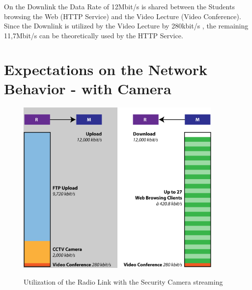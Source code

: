 \documentclass[a4paper,10pt]{book}\usepackage{graphicx}
\begin{document}
On the Downlink the Data Rate of 12Mbit/s is shared between the Students browsing the Web (HTTP Service) and the Video Lecture (Video Conference).
Since the Downlink is utilized by the Video Lecture by 280kbit/s , the remaining 11,7Mbit/s 
can be theoretically used by the HTTP Service.



\chapter{Expectations on the Network Behavior - with Camera}





\begin{figure}[!ht]
  \centering
    \includegraphics[width=0.9\textwidth]{graphics-01.png}
    \label{fig:g1}
    \caption{Utilization of the Radio Link with the Security Camera streaming}
\end{figure}










%  
% 
% 
% 
% 
% 
% 
% 
% 
% 
% 
\end{document}
